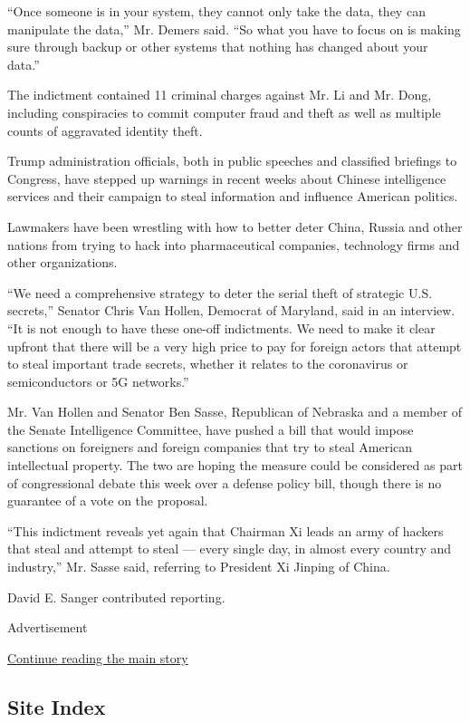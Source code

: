 ``Once someone is in your system, they cannot only take the data, they
can manipulate the data,'' Mr. Demers said. ``So what you have to focus
on is making sure through backup or other systems that nothing has
changed about your data.''

The indictment contained 11 criminal charges against Mr. Li and Mr.
Dong, including conspiracies to commit computer fraud and theft as well
as multiple counts of aggravated identity theft.

Trump administration officials, both in public speeches and classified
briefings to Congress, have stepped up warnings in recent weeks about
Chinese intelligence services and their campaign to steal information
and influence American politics.

Lawmakers have been wrestling with how to better deter China, Russia and
other nations from trying to hack into pharmaceutical companies,
technology firms and other organizations.

``We need a comprehensive strategy to deter the serial theft of
strategic U.S. secrets,'' Senator Chris Van Hollen, Democrat of
Maryland, said in an interview. ``It is not enough to have these one-off
indictments. We need to make it clear upfront that there will be a very
high price to pay for foreign actors that attempt to steal important
trade secrets, whether it relates to the coronavirus or semiconductors
or 5G networks.''

Mr. Van Hollen and Senator Ben Sasse, Republican of Nebraska and a
member of the Senate Intelligence Committee, have pushed a bill that
would impose sanctions on foreigners and foreign companies that try to
steal American intellectual property. The two are hoping the measure
could be considered as part of congressional debate this week over a
defense policy bill, though there is no guarantee of a vote on the
proposal.

``This indictment reveals yet again that Chairman Xi leads an army of
hackers that steal and attempt to steal --- every single day, in almost
every country and industry,'' Mr. Sasse said, referring to President Xi
Jinping of China.

David E. Sanger contributed reporting.

Advertisement

\protect\hyperlink{after-bottom}{Continue reading the main story}

\hypertarget{site-index}{%
\subsection{Site Index}\label{site-index}}

